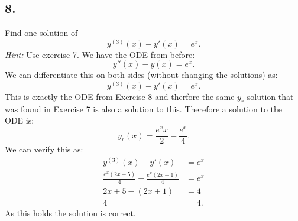 \subsection*{8.} Find one solution of
\[ 
y^{(3)}(x) - y'(x) = e^{x}
.\]
\textit{Hint:} Use exercise 7.
\bigbreak
We have the ODE from before:
\[ 
y''(x) - y(x) = e^{x}
.\]
We can differentiate this on both sides (without changing the solutions) as:
\[ 
y^{(3)}(x) - y'(x) = e^{x}
.\]
This is exactly the ODE from Exercise 8 and therfore the same $y_r$ solution that was found in Exercise 7 is also a solution to this. Therefore a solution to the ODE is:
\[ 
y_r(x) = \frac{e^{x} x}{2} - \frac{e^{x}}{4}
.\]
We can verify this as:
\begin{align*}
  y^{(3)}(x) - y'(x) &= e^{x}\\
  \frac{e^{x} (2x + 5)}{4} - \frac{e^{x} (2x + 1)}{4} &= e^{x} \\
  2x + 5 - ( 2x + 1) &= 4 \\
  4 &= 4
.\end{align*}
As this holds the solution is correct.
